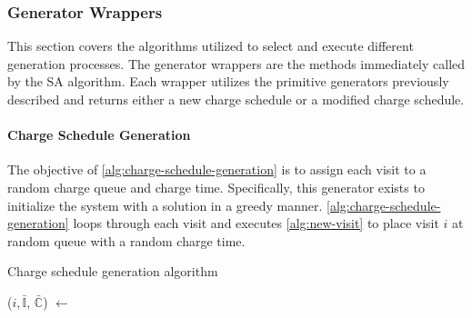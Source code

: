 \documentclass[energies,article,submit,moreauthors]{Definitions/mdpi}
\newcommand{\I}{\mathbb{I}}                 %
\newcommand{\C}{\mathbb{C}}                 %
\newcommand{\Sol}{\mathbb{S}}               %
\begin{document}
\subsubsection{Generator Wrappers}
\label{sec:generator-wrappers}
This section covers the algorithms utilized to select and execute different generation processes. The generator wrappers
are the methods immediately called by the SA algorithm. Each wrapper utilizes the primitive generators previously
described and returns either a new charge schedule or a modified charge schedule.

\paragraph{Charge Schedule Generation}
\label{sec:charge-schedule-generation}
The objective of \ref{alg:charge-schedule-generation} is to assign each visit to a random charge queue and charge time.
Specifically, this generator exists to initialize the system with a solution in a greedy manner.
\ref{alg:charge-schedule-generation} loops through each visit and executes \ref{alg:new-visit} to place visit \(i\) at
random queue with a random charge time.

\begin{algorithm}[H]
\scriptsize
\caption{Charge schedule generation algorithm} \label{alg:charge-schedule-generation}
    \LinesNumbered
    \KwIn{$\Sol$}
    \KwOut{$\bar{\Sol}$}


    \Begin
    {
        \ForEach {$\I_i \in \I$}
        {
            ($i, \bar{\I}$, $\bar{\C}$) $\leftarrow$ \NewVisit{($\I_i$, $\I$, $\C$)}
        }
            \Return{($0, \bar{\I}$, $\bar{\C}$)}
    }
  \end{algorithm}
\end{document}

